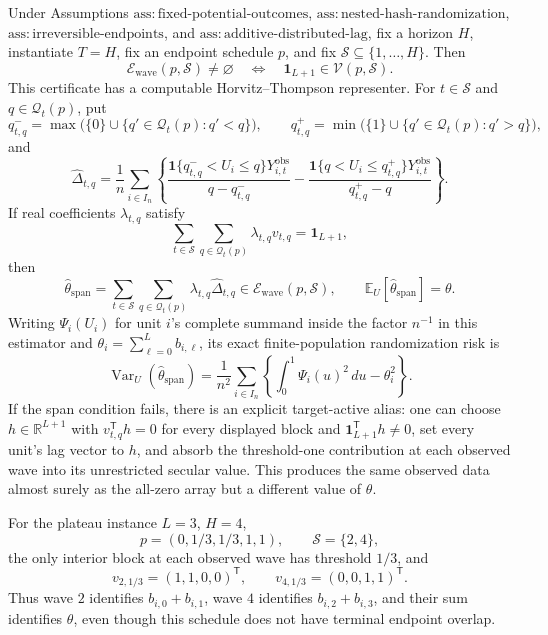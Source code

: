 Under Assumptions \(\mathrm{ass:fixed\text{-}potential\text{-}outcomes}\), \(\mathrm{ass:nested\text{-}hash\text{-}randomization}\), \(\mathrm{ass:irreversible\text{-}endpoints}\), and \(\mathrm{ass:additive\text{-}distributed\text{-}lag}\), fix a horizon \(H\), instantiate \(T=H\), fix an endpoint schedule \(p\), and fix \(\mathcal S\subseteq\{1,\ldots,H\}\).  Then
\[
 \mathcal E_{\mathrm{wave}}(p,\mathcal S)\ne\varnothing
 \quad\Longleftrightarrow\quad
 \mathbf 1_{L+1}\in\mathcal V(p,\mathcal S).
\]
This certificate has a computable Horvitz--Thompson representer.  For \(t\in\mathcal S\) and \(q\in\mathcal Q_t(p)\), put
\[
 q^-_{t,q}=\max\bigl(\{0\}\cup\{q'\in\mathcal Q_t(p):q'<q\}\bigr),
 \qquad
 q^+_{t,q}=\min\bigl(\{1\}\cup\{q'\in\mathcal Q_t(p):q'>q\}\bigr),
\]
and
\[
 \widehat\Delta_{t,q}
 =\frac1n\sum_{i\in I_n}\left\{
 \frac{\mathbf 1\{q^-_{t,q}<U_i\le q\}Y^{\mathrm{obs}}_{i,t}}
      {q-q^-_{t,q}}
 -\frac{\mathbf 1\{q<U_i\le q^+_{t,q}\}Y^{\mathrm{obs}}_{i,t}}
      {q^+_{t,q}-q}
 \right\}.
\]
If real coefficients \(\lambda_{t,q}\) satisfy
\[
 \sum_{t\in\mathcal S}\sum_{q\in\mathcal Q_t(p)}
 \lambda_{t,q}v_{t,q}=\mathbf 1_{L+1},
\]
then
\[
 \widehat\theta_{\mathrm{span}}
 =\sum_{t\in\mathcal S}\sum_{q\in\mathcal Q_t(p)}
   \lambda_{t,q}\widehat\Delta_{t,q}
 \in\mathcal E_{\mathrm{wave}}(p,\mathcal S),
 \qquad
 \mathbb E_U[\widehat\theta_{\mathrm{span}}]=\theta.
\]
Writing \(\Psi_i(U_i)\) for unit \(i\)'s complete summand inside the factor \(n^{-1}\) in this estimator and \(\theta_i=\sum_{\ell=0}^{L}b_{i,\ell}\), its exact finite-population randomization risk is
\[
 \operatorname{Var}_U(\widehat\theta_{\mathrm{span}})
 =\frac1{n^2}\sum_{i\in I_n}
 \left\{\int_0^1\Psi_i(u)^2\,du-\theta_i^2\right\}.
\]
If the span condition fails, there is an explicit target-active alias: one can choose \(h\in\mathbb R^{L+1}\) with \(v_{t,q}^{\mathsf T}h=0\) for every displayed block and \(\mathbf 1_{L+1}^{\mathsf T}h\ne0\), set every unit's lag vector to \(h\), and absorb the threshold-one contribution at each observed wave into its unrestricted secular value.  This produces the same observed data almost surely as the all-zero array but a different value of \(\theta\).

For the plateau instance \(L=3\), \(H=4\),
\[
 p=(0,1/3,1/3,1,1),
 \qquad \mathcal S=\{2,4\},
\]
the only interior block at each observed wave has threshold \(1/3\), and
\[
 v_{2,1/3}=(1,1,0,0)^{\mathsf T},
 \qquad
 v_{4,1/3}=(0,0,1,1)^{\mathsf T}.
\]
Thus wave \(2\) identifies \(b_{i,0}+b_{i,1}\), wave \(4\) identifies \(b_{i,2}+b_{i,3}\), and their sum identifies \(\theta\), even though this schedule does not have terminal endpoint overlap.